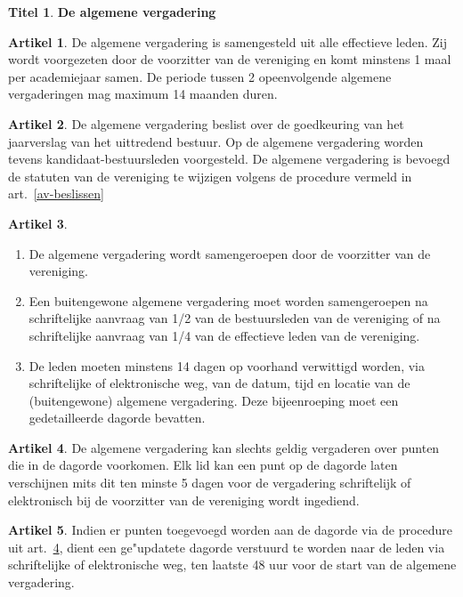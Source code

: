 \documentclass[a4paper,10pt]{article}
\theoremstyle{definition}
\newtheorem{titel}{\newline\Large Titel}
\newtheorem{artikel}{\large Artikel}
\newcommand{\ttext}[1]{\Large \textbf{#1} \normalsize}
\newcommand{\ttextcr}{\hfill\newline}
\newcommand{\ttextenum}{\mbox{}}
\begin{document}
\begin{titel}\ttext{De algemene vergadering}

  \begin{artikel}\ttextcr
    De algemene vergadering is samengesteld uit alle effectieve leden.
    Zij wordt voorgezeten door de voorzitter van de vereniging en komt minstens 1 maal per academiejaar samen.
    De periode tussen 2 opeenvolgende algemene vergaderingen mag maximum 14 maanden duren.
  \end{artikel}

  \begin{artikel}\ttextcr
    De algemene vergadering beslist over de goedkeuring van het jaarverslag van het uittredend bestuur.
    Op de algemene vergadering worden tevens kandidaat-bestuursleden voorgesteld.
    De algemene vergadering is bevoegd de statuten van de vereniging te wijzigen volgens de procedure vermeld in art.~\ref{av-beslissen}
  \end{artikel}

  \begin{artikel}\label{av-bijeenroeping}\ttextenum
    \begin{enumerate}
      \item
        De algemene vergadering wordt samengeroepen door de voorzitter van de vereniging.
      \item
        Een buitengewone algemene vergadering moet worden samengeroepen na schriftelijke aanvraag van 1/2 van de bestuursleden van de vereniging of na schriftelijke aanvraag van 1/4 van de effectieve leden van de vereniging.
      \item
        De leden moeten minstens 14 dagen op voorhand verwittigd worden, via schriftelijke of elektronische weg, van de datum, tijd en locatie van de (buitengewone) algemene vergadering.
        Deze bijeenroeping moet een gedetailleerde dagorde bevatten. %
    \end{enumerate}
  \end{artikel}

  \begin{artikel}\label{av-dagorde}\ttextcr
    De algemene vergadering kan slechts geldig vergaderen over punten die in de dagorde voorkomen.
    Elk lid kan een punt op de dagorde laten verschijnen mits dit ten minste 5 dagen voor de vergadering schriftelijk of elektronisch bij de voorzitter van de vereniging wordt ingediend.
  \end{artikel}

  \begin{artikel}\ttextcr
    Indien er punten toegevoegd worden aan de dagorde via de procedure uit art.~\ref{av-dagorde}, dient een ge"updatete dagorde verstuurd te worden naar de leden via schriftelijke of elektronische weg, ten laatste 48 uur voor de start van de algemene vergadering.
  \end{artikel}


\end{titel}
\end{document}
